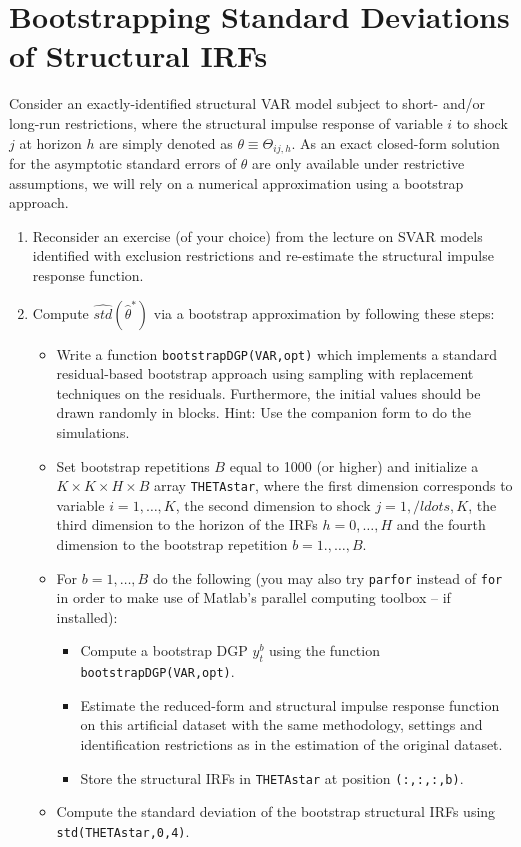 \section[Bootstrapping Standard Deviations of Structural IRFs]{Bootstrapping Standard Deviations of Structural IRFs\label{ex:BootstrapStandardDeviationStructuralIRFs}}
Consider an exactly-identified structural VAR model subject to short- and/or long-run restrictions,
  where the structural impulse response of variable \(i\) to shock \(j\) at horizon \(h\) are simply denoted as \(\theta \equiv \Theta_{ij,h}\).
As an exact closed-form solution for the asymptotic standard errors of \(\theta \) are only available under restrictive assumptions,
  we will rely on a numerical approximation using a bootstrap approach.
\begin{enumerate}
\item Reconsider an exercise (of your choice) from the lecture on SVAR models identified with exclusion restrictions
and re-estimate the structural impulse response function.

\item Compute \(\widehat{std}(\hat{\theta}^\ast)\) via a bootstrap approximation by following these steps:
\begin{itemize}
    \item Write a function \texttt{bootstrapDGP(VAR,opt)} which implements a standard residual-based bootstrap approach
      using sampling with replacement techniques on the residuals.
    Furthermore, the initial values should be drawn randomly in blocks.
    Hint: Use the companion form to do the simulations.
    \item Set bootstrap repetitions \(B\) equal to 1000 (or higher)
      and initialize a \(K \times K \times H \times B\) array \texttt{THETAstar},
      where the first dimension corresponds to variable \(i=1,\ldots,K\),
      the second dimension to shock \(j=1,/ldots,K\),
      the third dimension to the horizon of the IRFs \(h=0,\ldots,H\)
      and the fourth dimension to the bootstrap repetition \(b=1.,\ldots,B\).
    \item For \(b=1,\ldots,B\) do the following (you may also try \texttt{parfor} instead of \texttt{for}
      in order to make use of Matlab's parallel computing toolbox -- if installed):
    \begin{itemize}
        \item Compute a bootstrap DGP \(y_t^{b}\) using the function \texttt{bootstrapDGP(VAR,opt)}.
        \item Estimate the reduced-form and structural impulse response function on this artificial dataset
          with the same methodology, settings and identification restrictions as in the estimation of the original dataset.
        \item Store the structural IRFs in \texttt{THETAstar} at position \texttt{(:,:,:,b)}.
    \end{itemize}
	\item Compute the standard deviation of the bootstrap structural IRFs using \texttt{std(THETAstar,0,4)}.
\end{itemize}


\end{enumerate}
